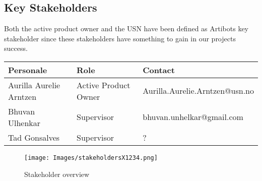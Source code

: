 \documentclass{article}
\begin{document}
\subsection {Key Stakeholders} 
Both the active product owner and the USN have been defined as Artibots key stakeholder since these stakeholders have something to gain in our projects success. 

\begin{table}[htbp]
\centering
    \begin{tabular}{ |l|l|l| }
        \hline
        \textbf{Personale} & \textbf{Role} & \textbf{Contact} \\ \hline
        Aurilla Aurelie Arntzen & Active Product Owner & Aurilla.Aurelie.Arntzen@usn.no \\ \hline
        Bhuvan Ulhenkar & Supervisor & bhuvan.unhelkar@gmail.com \\ \hline
        Tad Gonsalves & Supervisor & ?\\ 
        \hline
    \end{tabular}
\end{table}


\begin{figure}[H]
    \centering
  \texttt{[image: Images/stakeholdersX1234.png]}
  \caption{Stakeholder overview}
  \label{stakeholder}
\end{figure}
\end{document}
